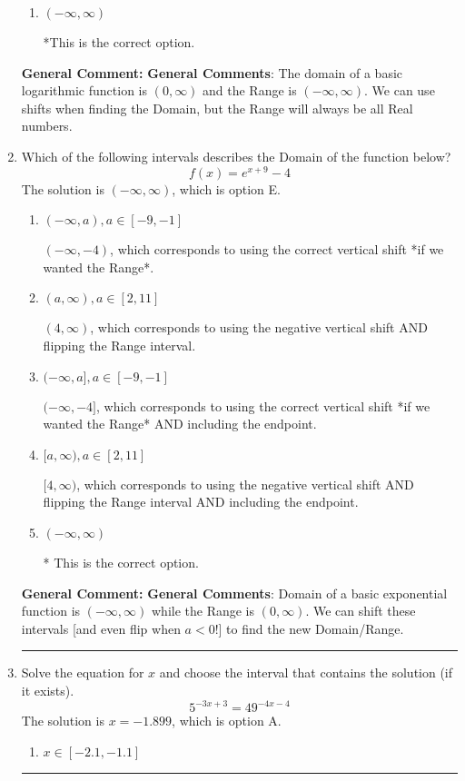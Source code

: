 \documentclass{extbook}[14pt]
\newcommand{\litem}[1]{\item #1

\rule{\textwidth}{0.4pt}}
\begin{document}
\begin{enumerate}
{\begin{enumerate}[label=\Alph*.]
$(-\infty, 7)$, which corresponds to using the using the negative of vertical shift on $(0, \infty)$.
\item \( (-\infty, \infty) \)

*This is the correct option.
\end{enumerate}

\textbf{General Comment:} \textbf{General Comments}: The domain of a basic logarithmic function is $(0, \infty)$ and the Range is $(-\infty, \infty)$. We can use shifts when finding the Domain, but the Range will always be all Real numbers.
}
\litem{
Which of the following intervals describes the Domain of the function below?
\[ f(x) = e^{x+9}-4 \]The solution is \( (-\infty, \infty) \), which is option E.\begin{enumerate}[label=\Alph*.]
\item \( (-\infty, a), a \in [-9, -1] \)

$(-\infty, -4)$, which corresponds to using the correct vertical shift *if we wanted the Range*.
\item \( (a, \infty), a \in [2, 11] \)

$(4, \infty)$, which corresponds to using the negative vertical shift AND flipping the Range interval.
\item \( (-\infty, a], a \in [-9, -1] \)

$(-\infty, -4]$, which corresponds to using the correct vertical shift *if we wanted the Range* AND including the endpoint.
\item \( [a, \infty), a \in [2, 11] \)

$[4, \infty)$, which corresponds to using the negative vertical shift AND flipping the Range interval AND including the endpoint.
\item \( (-\infty, \infty) \)

* This is the correct option.
\end{enumerate}

\textbf{General Comment:} \textbf{General Comments}: Domain of a basic exponential function is $(-\infty, \infty)$ while the Range is $(0, \infty)$. We can shift these intervals [and even flip when $a<0$!] to find the new Domain/Range.
}
\litem{
Solve the equation for $x$ and choose the interval that contains the solution (if it exists).
\[ 5^{-3x+3} = 49^{-4x-4} \]The solution is \( x = -1.899 \), which is option A.\begin{enumerate}[label=\Alph*.]
\item \( x \in [-2.1, -1.1] \)


\end{enumerate}}
\end{enumerate}
\end{document}
